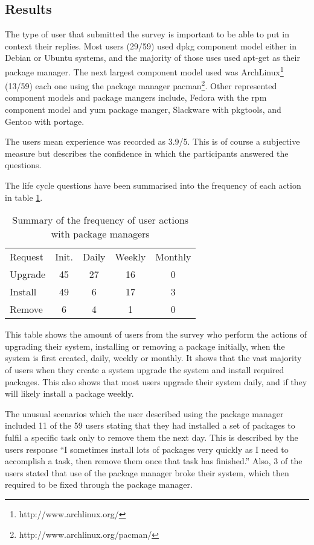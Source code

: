 \subsection{Results}
The type of user that submitted the survey is important to be able to put in context their replies.
Most users (29/59) used dpkg component model either in Debian or Ubuntu systems, and the majority of those uses used apt-get as their package manager.
The next largest component model used was ArchLinux\footnote{http://www.archlinux.org/} (13/59) each one using the package manager pacman\footnote{http://www.archlinux.org/pacman/}.
Other represented component models and package mangers include, Fedora with the rpm component model and yum package manger,
Slackware with pkgtools, and Gentoo with portage.

The users mean experience was recorded as 3.9/5.
This is of course a subjective measure but describes the confidence in which the participants answered the questions. 

The life cycle questions have been summarised into the frequency of each action in table \ref {strat.tblaction}.

\begin{table}[htp]
\begin{tabular}{l | c | c | c | c |}
Request & Init. & Daily & Weekly & Monthly \\
Upgrade  & 45 & 27 & 16 & 0 \\
Install & 49 & 6 & 17 & 3 \\
Remove & 6 & 4 & 1 & 0\\
\end{tabular}
\caption{Summary of the frequency of user actions with package managers}
\label{strat.tblaction}
\end{table}

This table shows the amount of users from the survey who perform the actions of upgrading their system, installing or removing a package 
initially, when the system is first created, daily, weekly or monthly.
It shows that the vast majority of users when they create a system upgrade the system and install required packages.
This also shows that most users upgrade their system daily, and if they will likely install a package weekly.

The unusual scenarios which the user described using the package manager included 
11 of the 59 users stating that they had installed a set of packages to fulfil a specific task only to remove them the next day.
This is described by the users response ``I sometimes install lots of packages very quickly as I need to accomplish a task, then remove them once that task has finished.''
Also, 3 of the users stated that use of the package manager broke their system, which then required to be fixed through the package manager.

